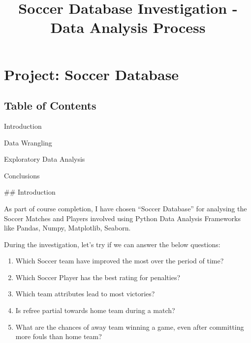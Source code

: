 \documentclass[11pt]{article}
\title{Soccer Database Investigation - Data Analysis Process}
\providecommand{\tightlist}{%
      \setlength{\itemsep}{0pt}\setlength{\parskip}{0pt}}
\begin{document}
    
    
    \maketitle
    
    

    
    \hypertarget{project-soccer-database}{%
\section{Project: Soccer Database}\label{project-soccer-database}}

\hypertarget{table-of-contents}{%
\subsection{Table of Contents}\label{table-of-contents}}

Introduction

Data Wrangling

Exploratory Data Analysis

Conclusions

     \#\# Introduction

As part of course completion, I have chosen ``Soccer Database'' for
analysing the Soccer Matches and Players involved using Python Data
Analysis Frameworks like Pandas, Numpy, Matplotlib, Seaborn.

During the investigation, let's try if we can answer the below
questions:

\begin{enumerate}
\def\labelenumi{\arabic{enumi}.}
\tightlist
\item
  Which Soccer team have improved the most over the period of time?
\item
  Which Soccer Player has the best rating for penalties?
\item
  Which team attributes lead to most victories?
\item
  Is refree partial towards home team during a match?
\item
  What are the chances of away team winning a game, even after
  committing more fouls than home team?
\end{enumerate}
\end{document}
